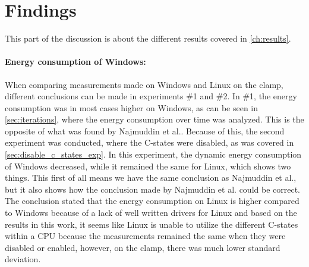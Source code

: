\section{Findings}

This part of the discussion is about the different results covered in \cref{ch:results}.

\paragraph*{Energy consumption of Windows:} When comparing measurements made on Windows and Linux on the clamp, different conclusions can be made in experiments \#1 and \#2. In \#1, the energy consumption was in most cases higher on Windows, as can be seen in \cref{sec:iterations}, where the energy consumption over time was analyzed. This is the opposite of what was found by Najmuddin et al.\cite[]{Najmuddin2021}. Because of this, the second experiment was conducted, where the C-states were disabled, as was covered in \cref{sec:disable_c_states_exp}. In this experiment, the dynamic energy consumption of Windows decreased, while it remained the same for Linux, which shows two things. This first of all means we have the same conclusion as Najmuddin et al.\cite[]{Najmuddin2021}, but it also shows how the conclusion made by Najmuddin et al.\cite[]{Najmuddin2021} could be correct. The conclusion stated that the energy consumption on Linux is higher compared to Windows because of a lack of well written drivers for Linux and based on the results in this work, it seems like Linux is unable to utilize the different C-states within a CPU because the measurements remained the same when they were disabled or enabled, however, on the clamp, there was much lower standard deviation.

